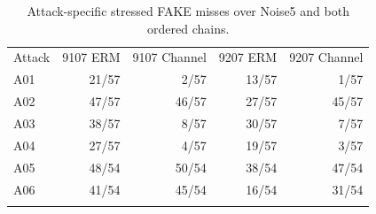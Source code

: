 \begin{table}[t]
\caption{Attack-specific stressed FAKE misses over Noise5 and both ordered chains.}\label{tab:attack}
\centering
\begin{tabular}{@{}lrrrr@{}}
\toprule
Attack & 9107 ERM & 9107 Channel & 9207 ERM & 9207 Channel \\
\colrule
A01 & 21/57 & 2/57 & 13/57 & 1/57 \\
A02 & 47/57 & 46/57 & 27/57 & 45/57 \\
A03 & 38/57 & 8/57 & 30/57 & 7/57 \\
A04 & 27/57 & 4/57 & 19/57 & 3/57 \\
A05 & 48/54 & 50/54 & 38/54 & 47/54 \\
A06 & 41/54 & 45/54 & 16/54 & 31/54 \\
\botrule
\end{tabular}
\end{table}

